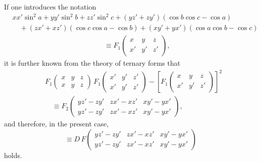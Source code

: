 \documentclass[11pt]{article}
\newcommand{\ffone}[6]{F_1\!\left(\begin{array}{ccc}#1&#2&#3\\#4&#5&#6\end{array}\right)}
\begin{document}
If one introduces the notation
\[
\begin{aligned}
&xx'\sin^2a+yy'\sin^2b+zz'\sin^2c+(yz'+zy')(\cos b\cos c-\cos a)\\
&\quad +(zx'+xz')(\cos c\cos a-\cos b)+(xy'+yx')(\cos a\cos b-\cos c)\\
&\hspace{13em}\equiv \ffone{x}{y}{z}{x'}{y'}{z'},
\end{aligned}
\]
it is further known from the theory of ternary forms that
\[
\begin{aligned}
&\ffone{x}{y}{z}{x}{y}{z}\,\ffone{x'}{y'}{z'}{x'}{y'}{z'}
-\left[\ffone{x}{y}{z}{x'}{y'}{z'}\right]^2\\
&\quad\equiv F_2\!\left(\begin{array}{ccc}
yz'-zy'&zx'-xz'&xy'-yx'\\
yz'-zy'&zx'-xz'&xy'-yx'
\end{array}\right),
\end{aligned}
\]
and therefore, in the present case,
\begin{equation}
\equiv D\,F\!\left(\begin{array}{ccc}
yz'-zy'&zx'-xz'&xy'-yx'\\
yz'-zy'&zx'-xz'&xy'-yx'
\end{array}\right)
\tag{7}
\end{equation}
holds.
\end{document}
